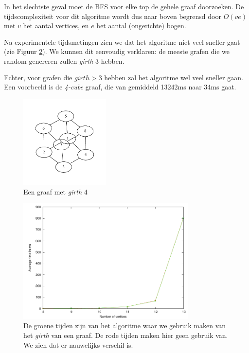 \documentclass{article}
\begin{document}
In het slechtste geval moet de BFS voor elke top de gehele graaf doorzoeken. De
tijdscomplexiteit voor dit algoritme wordt dus naar boven begrensd door $O(ve)$
met $v$ het aantal vertices, en $e$ het aantal (ongerichte) bogen.
\newline

Na experimentele tijdsmetingen zien we dat het algoritme niet veel sneller gaat
(zie Figuur \ref{fig:girth-vs-no-girth}). We kunnen dit eenvoudig verklaren: de
meeste grafen die we random genereren zullen \emph{girth} 3 hebben.
\newline

Echter, voor grafen die $girth > 3$ hebben zal het algoritme wel veel sneller
gaan. Een voorbeeld is de \emph{4-cube} graaf, die van gemiddeld 13242ms naar
34ms gaat.

\begin{figure}
\begin{center}
\includegraphics[width=0.4\textwidth]{images/cube.pdf}
\caption{Een graaf met \emph{girth} 4}
\label{fig:cube}
\end{center}
\end{figure}

\begin{figure}
\begin{center}
\includegraphics[width=0.8\textwidth]{images/girth-vs-no-girth.pdf}
\caption{De groene tijden zijn van het algoritme waar we gebruik maken van het
\emph{girth} van een graaf. De rode tijden maken hier geen gebruik van. We zien
dat er nauwelijks verschil is.}
\label{fig:girth-vs-no-girth}
\end{center}
\end{figure}
\end{document}
